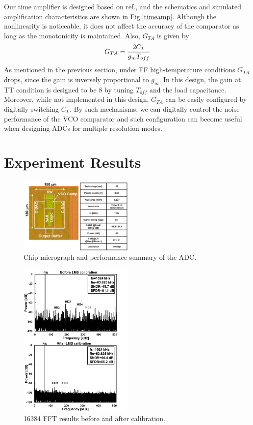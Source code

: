\documentclass[letterpaper, 10 pt, conference]{ieeeconf}  %
\begin{document}
Our time amplifier is designed based on ref.\cite{lee20089}, and the schematics and simulated amplification characteristics are shown in Fig.\ref{timeamp}. Although the nonlinearity is noticeable, it does not affect the accuracy of the comparator as long as the monotonicity is maintained.
Also, $G_{TA}$ is given by
\begin{eqnarray}
    \centering
    G_{TA} = \frac{2C_L}{g_mT_{off}}
    \label{gta}
\end{eqnarray}
As mentioned in the previous section, under FF high-temperature conditions $G_{TA}$ drops, since the gain is inversely proportional to $g_m$.
In this design, the gain at TT condition is designed to be 8 by tuning $T_{off}$ and the load capacitance. Moreover, while not implemented in this design, $G_{TA}$ can be easily configured by digitally switching $C_L$. By such mechanisms, we can digitally control the noise performance of the VCO comparator and such configuration can become useful when designing ADCs for multiple resolution modes\cite{harpe201310b}.

\section{Experiment Results}
\begin{figure}[ht!]
\centering
 \includegraphics[width=0.5\textwidth]{figs/chipphoto.png}
  \captionsetup{font=footnotesize}
  \caption{Chip micrograph and performance summary of the ADC.}
  \label{chipphoto}
\end{figure}

\begin{figure}[ht!]
\centering
 \includegraphics[width=0.5\textwidth]{figs/fft.png}
  \captionsetup{font=footnotesize}
  \caption{16384 FFT results before and after calibration.}
  \label{aftercal}
\end{figure}
\end{document}
